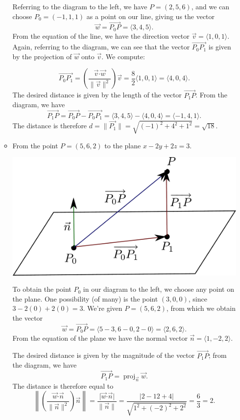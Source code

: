 \documentclass[12pt]{article}
\newcommand{\dotp}{\boldsymbol{\cdot}}
\newcommand{\abs}[1]{\lvert #1\rvert}
\newcommand{\len}[1]{\lVert #1\rVert}
\begin{document}
\begin{enumerate}
\begin{itemize}
\begin{multicols}{2}
Referring to the diagram to the left, we have $P=(2,5,6)$, and we can choose $P_0 = (-1,1,1)$ as a point on our line, giving us the vector
\[
 \vec{w} = \overrightarrow{P_0P} = \langle 3,4,5\rangle.
\]
From the equation of the line, we have the direction vector $\vec{v} = \langle 1,0,1\rangle$. Again, referring to the diagram, we can see that the vector $\overrightarrow{P_0P_1}$ is given by the projection of $\vec{w}$ onto $\vec{v}$. We compute:
\end{multicols}
\[
 \overrightarrow{P_0P_1} = \left(\frac{\vec{v}\dotp\vec{w}}{\len{\vec{v}}^2}\right)\vec{v} = \frac{8}{2}\langle 1,0,1\rangle = \langle 4,0,4\rangle.
\]
The desired distance is given by the length of the vector $\overrightarrow{P_1P}$. From the diagram, we have
\[
 \overrightarrow{P_1P} = \overrightarrow{P_0P}-\overrightarrow{P_0P_1} = \langle 3,4,5\rangle - \langle 4,0,4\rangle = \langle -1,4,1\rangle.
\]
The distance is therefore $d=\len{\overrightarrow{P_1}} = \sqrt{(-1)^2+4^2+1^2} = \sqrt{18}$.

\newpage

\item From the point $P=(5, 6, 2)$ to the plane $x-2y+2z=3$.

\begin{multicols}{2}
 \begin{center}
  \includegraphics[width=0.75\columnwidth]{WS3-4}
 \end{center}
\columnbreak

To obtain the point $P_0$ in our diagram to the left, we choose any point on the plane. One possibility (of many) is the point $(3,0,0)$, since $3-2(0)+2(0)=3$. We're given $P=(5,6,2)$, from which we obtain the vector 
\[
 \vec{w} = \overrightarrow{P_0P} = \langle 5-3,6-0,2-0\rangle = \langle 2,6,2\rangle.
\]
From the equation of the plane we have the normal vector $\vec{n} = \langle 1,-2,2\rangle$. 
\end{multicols}
The desired distance is given by the magnitude of the vector $\overrightarrow{P_1P}$; from the diagram, we have
\[
 \overrightarrow{P_1P} = \operatorname{proj}_{\vec{n}}\vec{w}.
\]
The distance is therefore equal to
\[
 \left\lVert\left(\frac{\vec{w}\dotp\vec{n}}{\len{\vec{n}}^2}\right)\vec{n}\right\rVert = \frac{\abs{\vec{w}\dotp\vec{n}}}{\len{\vec{n}}} = \frac{\abs{2-12+4}}{\sqrt{1^2+(-2)^2+2^2}} = \frac{6}{3}=2.
\]

\end{itemize}





\end{enumerate}
\end{document}
